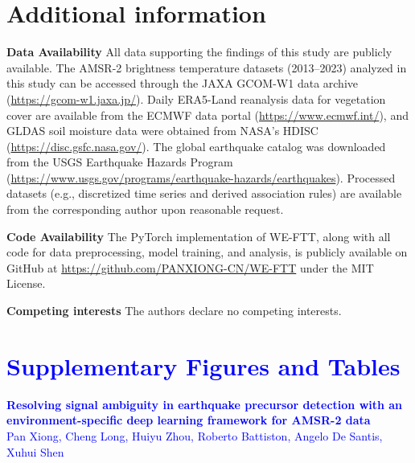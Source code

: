 \documentclass[preprint,review,12pt,authoryear]{elsarticle}
\providecommand{\DIFaddtex}[1]{{\sf #1}} %
\providecommand{\DIFaddbegin}{} %
\providecommand{\DIFadd}[1]{\texorpdfstring{\DIFaddtex{#1}}{#1}} %
\newcommand{\DIFaddincludegraphics}[2][]{{\color{blue}\fbox{\DIFOincludegraphics[#1]{#2}}}} %
\DeclareRobustCommand{\DIFaddbegin}{\DIFOaddbegin \let\includegraphics\DIFaddincludegraphics} %
\renewcommand{\DIFaddtex}[1]{\textcolor{blue}{#1}}
\begin{document}
\section*{Additional information}
\textbf{Data Availability} All data supporting the findings of this study are publicly available. The AMSR-2 brightness temperature datasets (2013--2023) analyzed in this study can be accessed through the JAXA GCOM-W1 data archive (\url{https://gcom-w1.jaxa.jp/}). Daily ERA5-Land reanalysis data for vegetation cover are available from the ECMWF data portal (\url{https://www.ecmwf.int/}), and GLDAS soil moisture data were obtained from NASA's HDISC (\url{https://disc.gsfc.nasa.gov/}). The global earthquake catalog was downloaded from the USGS Earthquake Hazards Program (\url{https://www.usgs.gov/programs/earthquake-hazards/earthquakes}). Processed datasets (e.g., discretized time series and derived association rules) are available from the corresponding author upon reasonable request.

\textbf{Code Availability} The PyTorch implementation of WE-FTT, along with all code for data preprocessing, model training, and analysis, is publicly available on GitHub at \url{https://github.com/PANXIONG-CN/WE-FTT} under the MIT License.

\textbf{Competing interests} The authors declare no competing interests.
\DIFaddbegin 

\clearpage
\section*{\DIFadd{Supplementary Figures and Tables}}

\begin{center}
{\Large \DIFadd{\textbf{Resolving signal ambiguity in earthquake precursor detection with an environment-specific deep learning framework for AMSR-2 data}}}\\[0.75em]
\DIFadd{Pan Xiong, Cheng Long, Huiyu Zhou, Roberto Battiston, Angelo De Santis, Xuhui Shen
}\end{center}

\vspace{1em}
\end{document}
